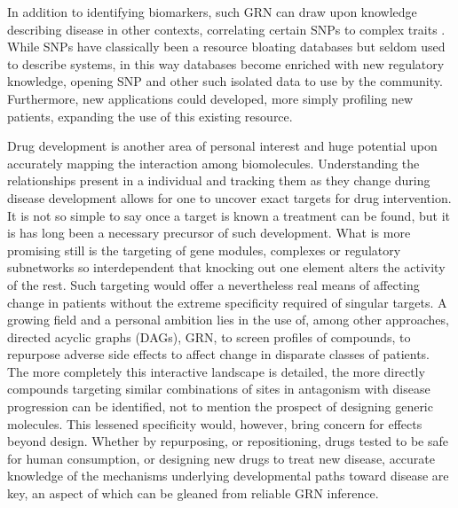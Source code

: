 In addition to identifying biomarkers, such GRN can draw upon knowledge describing disease in other contexts, \eg correlating certain SNPs to complex traits \cite{platig2016bipartite}. While SNPs have classically been a resource bloating databases but seldom used to describe systems, in this way databases become enriched with new regulatory knowledge, opening SNP and other such isolated data to use by the community. Furthermore, new applications could developed, \eg more simply profiling new patients, expanding the use of this existing resource. 

Drug development is another area of personal interest and huge potential upon accurately mapping the interaction among biomolecules. Understanding the relationships present in a individual and tracking them as they change during disease development allows for one to uncover exact targets for drug intervention. It is not so simple to say once a target is known a treatment can be found, but it is has long been a necessary precursor of such development. What is more promising still is the targeting of gene modules, complexes or regulatory subnetworks so interdependent that knocking out one element alters the activity of the rest. Such targeting would offer a nevertheless real means of affecting change in patients without the extreme specificity required of singular targets. A growing field and a personal ambition lies in the use of, among other approaches, directed acyclic graphs (DAGs), \ie GRN, to screen profiles of compounds, to repurpose adverse side effects to affect change in disparate classes of patients. The more completely this interactive landscape is detailed, the more directly compounds targeting similar combinations of sites in antagonism with disease progression can be identified, not to mention the prospect of designing generic molecules. This lessened specificity would, however, bring concern for effects beyond design. Whether by repurposing, or repositioning, drugs tested to be safe for human consumption, or designing new drugs to treat new disease, accurate knowledge of the mechanisms underlying developmental paths toward disease are key, an aspect of which can be gleaned from reliable GRN inference.
